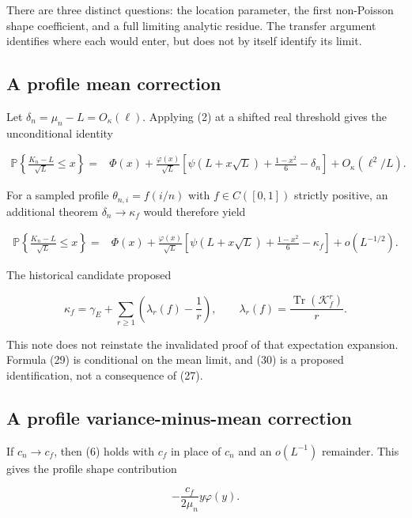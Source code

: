\documentclass[
  11pt,
]{article}
\begin{document}
There are three distinct questions: the location parameter, the first
non-Poisson shape coefficient, and a full limiting analytic residue. The
transfer argument identifies where each would enter, but does not by
itself identify its limit.

\subsection{A profile mean correction}\label{a-profile-mean-correction}

Let \(\delta_n=\mu_n-L=O_\kappa(\ell)\). Applying (2) at a shifted real
threshold gives the unconditional identity

\[
\begin{split}
\mathbb P\left\{\frac{K_n-L}{\sqrt L}\le x\right\}
={}&\Phi(x)+\frac{\varphi(x)}{\sqrt L}
\left[\psi(L+x\sqrt L)+\frac{1-x^2}{6}-\delta_n\right]
+O_\kappa(\ell^2/L).
\end{split}
\tag{28}
\]

For a sampled profile \(\theta_{n,i}=f(i/n)\) with \(f\in C([0,1])\)
strictly positive, an additional theorem \(\delta_n\to\kappa_f\) would
therefore yield

\[
\begin{split}
\mathbb P\left\{\frac{K_n-L}{\sqrt L}\le x\right\}
={}&\Phi(x)+\frac{\varphi(x)}{\sqrt L}
\left[\psi(L+x\sqrt L)+\frac{1-x^2}{6}-\kappa_f\right]
+o(L^{-1/2}).
\end{split}
\tag{29}
\]

The historical candidate proposed

\[
\kappa_f=\gamma_E+\sum_{r\ge1}\left(\lambda_r(f)-\frac1r\right),
\qquad \lambda_r(f)=\frac{\operatorname{Tr}(\mathcal K_f^r)}r.
\tag{30}
\]

This note does not reinstate the invalidated proof of that expectation
expansion. Formula (29) is conditional on the mean limit, and (30) is a
proposed identification, not a consequence of (27).

\subsection{A profile variance-minus-mean
correction}\label{a-profile-variance-minus-mean-correction}

If \(c_n\to c_f\), then (6) holds with \(c_f\) in place of \(c_n\) and
an \(o(L^{-1})\) remainder. This gives the profile shape contribution

\[
-\frac{c_f}{2\mu_n}y\varphi(y).
\tag{31}
\]
\end{document}
